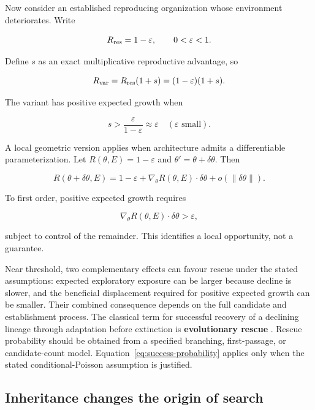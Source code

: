 \documentclass[11pt,a4paper]{article}
\begin{document}
Now consider an established reproducing organization whose environment deteriorates. Write

\[
R_{\rm res}=1-\varepsilon,
\qquad0<\varepsilon<1.
\]

Define $s$ as an exact multiplicative reproductive advantage, so

\[
R_{\rm var}=R_{\rm res}(1+s)=(1-\varepsilon)(1+s).
\]

The variant has positive expected growth when

\begin{equation}
s>\frac{\varepsilon}{1-\varepsilon}\approx\varepsilon
\quad(\varepsilon\text{ small}).
\label{eq:rescue-step}
\end{equation}

A local geometric version applies when architecture admits a differentiable parameterization. Let $R(\theta,E)=1-\varepsilon$ and $\theta'=\theta+\delta\theta$. Then

\[
R(\theta+\delta\theta,E)
=
1-\varepsilon+\nabla_\theta R(\theta,E)\cdot\delta\theta+o(\|\delta\theta\|).
\]

To first order, positive expected growth requires

\begin{equation}
\nabla_\theta R(\theta,E)\cdot\delta\theta>\varepsilon,
\label{eq:gradient-rescue}
\end{equation}

subject to control of the remainder. This identifies a local opportunity, not a guarantee.

Near threshold, two complementary effects can favour rescue under the stated assumptions: expected exploratory exposure can be larger because decline is slower, and the beneficial displacement required for positive expected growth can be smaller. Their combined consequence depends on the full candidate and establishment process. The classical term for successful recovery of a declining lineage through adaptation before extinction is \textbf{evolutionary rescue} \citep{Bell2017}. Rescue probability should be obtained from a specified branching, first-passage, or candidate-count model. Equation~\eqref{eq:success-probability} applies only when the stated conditional-Poisson assumption is justified.

\subsection{Inheritance changes the origin of search}
\end{document}
